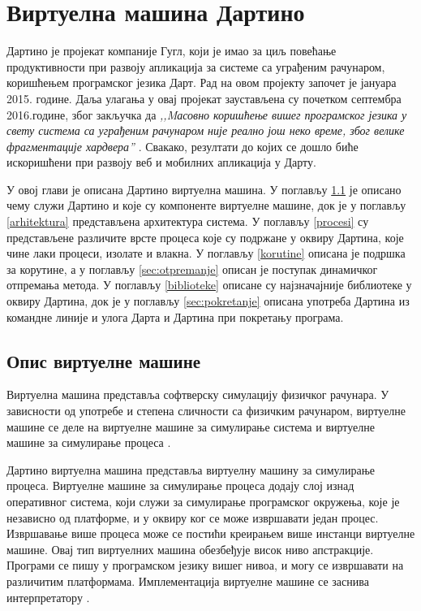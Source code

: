 \documentclass[12pt,oneside]{memoir}
\begin{document}
\chapter{Виртуелна машина Дартино}
\label{chp:dartino}
Дартино је пројекат компаније Гугл, који је имао за циљ повећање продуктивности при развоју апликација за системе са уграђеним рачунаром, коришћењем програмског језика Дарт. Рад на овом пројекту започет је јануара 2015. године. Даља улагања у овај пројекат заустављена су почетком септембра 2016.године, због закључка да \textit{,,Mасовно коришћење вишег програмског језика у свету система са уграђеним рачунаром није реално још неко време, због велике фрагментације хардвера''} \cite{dartino_sajt}. Свакако, резултати до којих се дошло биће искоришћени при развоју веб и мобилних апликација у Дарту.

У овој глави је описана Дартино виртуелна машина. У поглављу \ref{sec:opis} је описано чему служи Дартино и које су компоненте виртуелне машине, док је у поглављу \ref{arhitektura} представљена архитектура система. У поглављу \ref{procesi} су представљене различите врсте процеса које су подржане у оквиру Дартина, које чине лаки процеси, изолате и влакна.
У поглављу \ref{korutine} описана је подршка за корутине, а у поглављу \ref{sec:otpremanje} описан је поступак динамичког отпремања метода. У поглављу \ref{biblioteke} описане су најзначајније библиотеке у оквиру Дартина, док је у поглављу \ref{sec:pokretanje} описана употреба Дартина из командне линије и улога Дарта и Дартина при покретању програма.
\section{Опис виртуелне машине}
\label{sec:opis}

Виртуелна машина представља софтверску симулацију физичког рачунара. У зависности од употребе и степена сличности са физичким рачунаром, виртуелне машине се деле на виртуелне машине за симулирање система и виртуелне машине за симулирање процеса \cite{virtuelna_masina}.

Дартино виртуелна машина представља виртуелну машину за симулирање процеса. Виртуелне машине за симулирање процеса додају слој изнад оперативног система, који служи за симулирање програмског окружења, које је независно од платформе, и у оквиру ког се може извршавати један процес. Извршавање више процеса може се постићи креирањем више инстанци виртуелне машине. Овај тип виртуелних машина обезбеђује висок ниво апстракције. Програми се пишу у програмском језику вишег нивоа, и могу се извршавати на различитим платформама. Имплементација виртуелне машине се заснива интерпретатору \cite{virtuelna_masina}.
\end{document}
